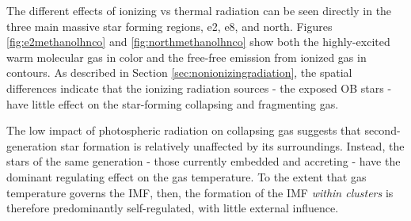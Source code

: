 \documentclass{emulateapj}
\begin{document}
The different effects of ionizing vs thermal radiation can be seen directly in
the three main massive star forming regions, e2, e8, and north.  Figures
\ref{fig:e2methanolhnco} and \ref{fig:northmethanolhnco} show both the
highly-excited warm molecular gas in color and the free-free emission from
ionized gas in contours.  As described in Section
\ref{sec:nonionizingradiation}, the spatial differences indicate that the
ionizing radiation sources - the exposed OB stars - have little effect on the
star-forming collapsing and fragmenting gas.

The low impact of photospheric radiation on collapsing gas suggests that
second-generation star formation is relatively unaffected by its surroundings.
Instead, the stars of the same generation - those currently embedded and
accreting - have the dominant regulating effect on the gas temperature.  To the
extent that gas temperature governs the IMF, then, the formation of the IMF
\emph{within clusters} is therefore predominantly self-regulated, with little
external influence.



\end{document}
